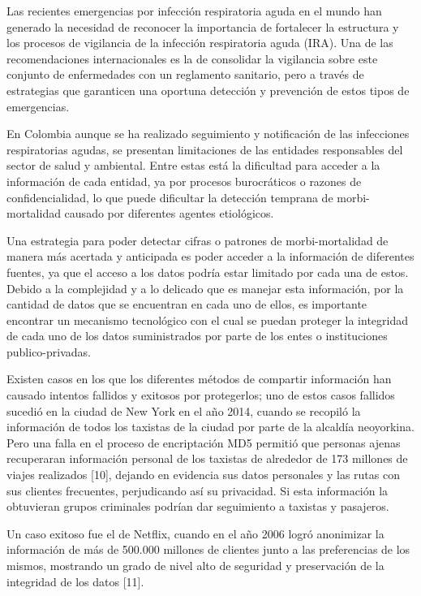 \documentclass[a4paper, 12pt, oneside]{article}
\theoremstyle{definition}
\theoremstyle{remark}
\begin{document}
Las recientes emergencias por infección respiratoria aguda en el mundo han generado la necesidad de reconocer la importancia de fortalecer la estructura y los procesos de vigilancia de la infección respiratoria
aguda (IRA). Una de las recomendaciones internacionales es la de consolidar la vigilancia sobre este conjunto de enfermedades con un reglamento sanitario, pero a través de estrategias que garanticen una oportuna detección y prevención de estos tipos de emergencias.

En Colombia aunque se ha realizado seguimiento y notificación de las infecciones respiratorias agudas, se presentan limitaciones de las entidades responsables del sector de salud y ambiental. Entre estas está la dificultad para acceder a la información de cada entidad, ya por procesos burocráticos o razones de confidencialidad, lo que puede dificultar la detección temprana de morbi-mortalidad causado por diferentes agentes etiológicos.

Una estrategia para poder detectar cifras o patrones de morbi-mortalidad de manera más acertada y anticipada es poder acceder a la información de diferentes fuentes, ya que el acceso a los datos podría estar limitado por cada una de estos. Debido a la complejidad y a lo delicado que es manejar esta información, por la cantidad de datos que se encuentran en cada uno de ellos, es importante encontrar un mecanismo tecnológico con el cual se puedan proteger la integridad de cada uno de los datos suministrados por parte de los entes o instituciones publico-privadas.

Existen casos en los que los diferentes métodos de compartir información han causado intentos fallidos y exitosos por protegerlos; uno de estos casos fallidos sucedió en la ciudad de New York en el año 2014, cuando se recopiló la información de todos los taxistas de la ciudad por parte de la alcaldía neoyorkina. Pero una falla en el proceso de encriptación MD5 permitió que personas ajenas recuperaran información personal de los taxistas de alrededor de 173 millones de viajes realizados [10], dejando en evidencia sus datos personales y las rutas con sus clientes frecuentes,  perjudicando así su privacidad. Si esta información la obtuvieran grupos criminales podrían dar seguimiento a taxistas y pasajeros.

Un caso exitoso fue el de Netflix, cuando en el año 2006 logró anonimizar la información de más de 500.000 millones de clientes junto a las preferencias de los mismos, mostrando un grado de nivel alto de seguridad y preservación de la integridad de los datos [11].
\end{document}
